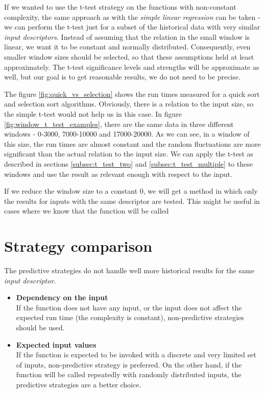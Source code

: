 If we wanted to use the t-test strategy on the functions with non-constant complexity, the same approach as with the \textit{simple linear regression} can be taken - we can perform the t-test just for a subset of the historical data with very similar \textit{input descriptors}. Instead of assuming that the relation in the small window is linear, we want it to be constant and normally distributed. Consequently, even smaller window sizes should be selected, so that these assumptions held at least approximately. The t-test significance levels and strengths will be approximate as well, but our goal is to get reasonable results, we do not need to be precise.

The figure \ref{fig:quick_vs_selection} shows the run times measured for a quick sort and selection sort algorithms. Obviously, there is a relation to the input size, so the simple t-test would not help us in this case. In figure \ref{fig:window_t_test_examples}, there are the same data in three different windows - 0-3000, 7000-10000 and 17000-20000. As we can see, in a window of this size, the run times are almost constant and the random fluctuations are more significant than the actual relation to the input size. We can apply the t-test as described in sections \ref{subsec:t_test_two} and \ref{subsec:t_test_multiple} to these windows and use the result as relevant enough with respect to the input.

If we reduce the window size to a constant 0, we will get a method in which only the results for inputs with the same descriptor are tested. This might be useful in cases where we know that the function will be called 

\section{Strategy comparison}

The predictive strategies do not handle well more historical results for the same \textit{input descriptor}.

\begin{itemize}
	\item \textbf{Dependency on the input} \\
	If the function does not have any input, or the input does not affect the expected run time (the complexity is constant), non-predictive strategies should be used.
	\item \textbf{Expected input values} \\
	If the function is expected to be invoked with a discrete and very limited set of inputs, non-predictive strategy is preferred. On the other hand, if the function will be called repeatedly with randomly distributed inputs, the predictive strategies are a better choice.
\end{itemize}

